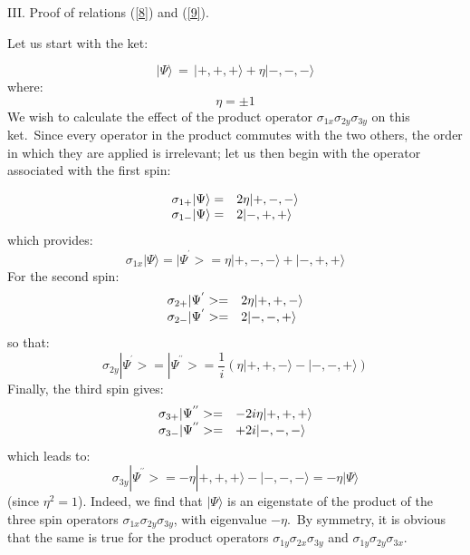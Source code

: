 \documentclass[12pt,onecolumn]{article}%
\begin{document}
\bigskip

\begin{center}
III. Proof of relations (\ref{8}) and (\ref{9}).
\end{center}

Let us start with the ket:%

\begin{equation}
|\Psi\rangle \,=\,|+,+,+\rangle +\eta|-,-,-\rangle  \label{a1}%
\end{equation}
where:
\begin{equation}
\eta=\pm1 \label{a2}%
\end{equation}
We wish to calculate the effect of the product operator $\sigma_{1x}%
\sigma_{2y}\sigma_{3y}$ on this ket.\ Since every operator in the product
commutes with the two others, the order in which they are applied is
irrelevant; let us then begin with the operator associated with the first spin:%

\begin{equation}%
\begin{array}
[c]{ll}%
\sigma_{1+}|\Psi\rangle = & 2\eta|+,-,-\rangle \\
\sigma_{1-}|\Psi\rangle = & 2|-,+,+\rangle 
\end{array}
\label{a3}%
\end{equation}
which provides:
\begin{equation}
\sigma_{1x}|\Psi\rangle =|\Psi^{^{\prime}}>=\eta|+,-,-\rangle +|-,+,+\rangle 
\label{a4}%
\end{equation}
For the second spin:
\begin{equation}%
\begin{array}
[c]{ll}%
\sigma_{2+}|\Psi^{^{\prime}}>= & 2\eta|+,+,-\rangle \\
\sigma_{2-}|\Psi^{^{\prime}}>= & 2|-,-,+\rangle 
\end{array}
\label{a5}%
\end{equation}
so that:
\begin{equation}
\sigma_{2y}|\Psi^{^{\prime}}>=|\Psi^{^{\prime\prime}}>=\frac{1}%
{i}\left(  \eta|+,+,-\rangle -|-,-,+\rangle \right)  \label{a6}%
\end{equation}
Finally, the third spin gives:
\begin{equation}%
\begin{array}
[c]{ll}%
\sigma_{3+}|\Psi^{^{\prime\prime}}>= & -2i\eta|+,+,+\rangle \\
\sigma_{3-}|\Psi^{^{\prime\prime}}>= & +2i|-,-,-\rangle 
\end{array}
\label{a7}%
\end{equation}
which leads to:
\begin{equation}
\sigma_{3y}|\Psi^{^{\prime\prime}}>=-\eta|+,+,+\rangle -|-,-,-\rangle =-\eta
|\Psi\rangle  \label{a8}%
\end{equation}
(since $\eta^{2}=1$). Indeed, we find that $|\Psi\rangle $ is an eigenstate of the
product of the three spin operators $\sigma_{1x}\sigma_{2y}\sigma_{3y}$, with
eigenvalue $-\eta$.\ By symmetry, it is obvious that the same is true for the
product operators $\sigma_{1y}\sigma_{2x}\sigma_{3y}$ and $\sigma_{1y}%
\sigma_{2y}\sigma_{3x}$.
\end{document}

